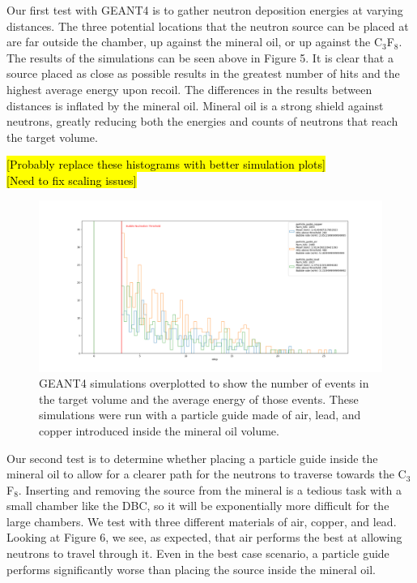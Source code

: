 \documentclass[%
12pt,
twoside,
reprint,
amsmath,amssymb,
aps,
]{article}
\begin{document}
	\par Our first test with GEANT4 is to gather neutron deposition energies at varying distances. The three potential locations that the neutron source can be placed at are far outside the chamber, up against the mineral oil, or up against the C$_{3}$F$_{8}$. The results of the simulations can be seen above in Figure 5. It is clear that a source placed as close as possible results in the greatest number of hits and the highest average energy upon recoil. The differences in the results between distances is inflated by the mineral oil. Mineral oil is a strong shield against neutrons, greatly reducing both the energies and counts of neutrons that reach the target volume.
	
	\noindent \hl{[Probably replace these histograms with better simulation plots]} \\
	\hl{[Need to fix scaling issues]}
	
	\begin{figure}[H]
		\includegraphics[scale = 0.45, center]{Images/histogram_particle_guide.png}
		\caption{\label{tab:table-name} GEANT4 simulations overplotted to show the number of events in the target volume and the average energy of those events. These simulations were run with a particle guide made of air, lead, and copper introduced inside the mineral oil volume.}
	\end{figure}

	\par Our second test is to determine whether placing a particle guide inside the mineral oil to allow for a clearer path for the neutrons to traverse towards the C$_{3}$F$_{8}$. Inserting and removing the source from the mineral is a tedious task with a small chamber like the DBC, so it will be exponentially more difficult for the large chambers. We test with three different materials of air, copper, and lead. Looking at Figure 6, we see, as expected, that air performs the best at allowing neutrons to travel through it. Even in the best case scenario, a particle guide performs significantly worse than placing the source inside the mineral oil.
\end{document}
